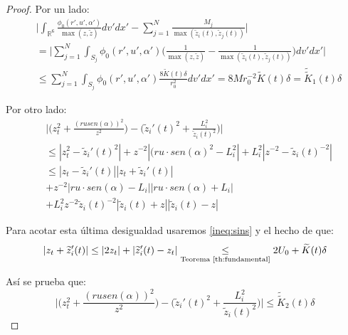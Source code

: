 \documentclass[a4paper,10pt]{scrartcl}
\theoremstyle{definition}
\newcommand{\ktilde}{\widetilde{K}}
\newcommand{\dtilde}[1]{\widetilde{\widetilde{#1}}}
\numberwithin{equation}{section}
\begin{document}
\begin{proof}
Por un lado:
\begin{align*}
 &\Bigg|\int_{\mathbb{R}^6}\frac{\phi_0(r',u',\alpha')}{\max(z,\widetilde{z})} dv' dx' - \sum_{j=1}^N \frac{M_j}{\max(\widetilde{z}_i(t), \widetilde{z}_j(t))} \Bigg| \\
 &= \Bigg|\sum_{j=1}^N \int_{S_j}\phi_0(r',u',\alpha') \Bigg(\frac{1}{\max(z,\widetilde{z})} - \frac{1}{\max(\widetilde{z}_i(t), \widetilde{z}_j(t))} \Bigg)dv' dx'\Bigg| \\
 &\le \sum_{j=1}^N \int_{S_j} \phi_0(r',u',\alpha') \frac{8\ktilde(t)\delta}{r_0^2} dv' dx' = 8Mr_0^{-2} \ktilde(t) \delta = \dtilde{K}_1(t) \delta
\end{align*}

Por otro lado:
\begin{align*}
&\Bigg|\Bigg(z_t^2 + \frac{(ru sen(\alpha))^2}{z^2}\Bigg) - \Bigg(\widetilde{z}_i'(t)^2 + \frac{L_i^2}{\widetilde{z}_i(t)^2} \Bigg)\Bigg| \\
&\le |z_t^2 - \widetilde{z}_i'(t)^2| + z^{-2}|(ru \cdot sen(\alpha)^2 - L_i^2| + L_i^2|z^{-2} - \widetilde{z}_i(t)^{-2}| \\
&\le |z_t - \widetilde{z}_i'(t)||z_t +\widetilde{z}_i'(t)| \\
&+ z^{-2}|ru \cdot sen(\alpha) - L_i||ru \cdot sen(\alpha) + L_i| \\
&+ L_i^2 z^{-2} \widetilde{z}_i(t)^{-2} |\widetilde{z}_i(t) + z||\widetilde{z}_i(t) - z|
\end{align*}

Para acotar esta última desigualdad usaremos \eqref{ineq:sins} y el hecho de que:
\[
|z_t + \widetilde{z}_i'(t)| \le |2z_t| + |\widetilde{z}_i'(t) - z_t| \underset{\textrm{Teorema \eqref{th:fundamental}}}{\le} 2U_0 + \ktilde(t) \delta
\]

Así se prueba que: 
\[
 \Bigg|\Bigg(z_t^2 + \frac{(ru sen(\alpha))^2}{z^2}\Bigg) - \Bigg(\widetilde{z}_i'(t)^2 + \frac{L_i^2}{\widetilde{z}_i(t)^2} \Bigg)\Bigg| \le \dtilde{K}_2(t) \delta
\]


\end{proof}
\end{document}
